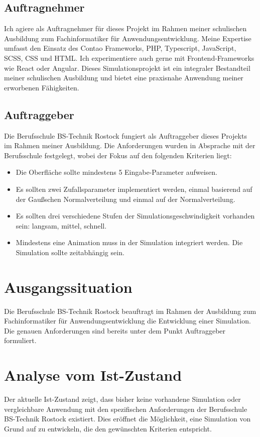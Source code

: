 \documentclass[hidelinks,12pt]{article}
\begin{document}
\subsection{Auftragnehmer}
Ich agiere als Auftragnehmer für dieses Projekt im Rahmen meiner schulischen Ausbildung zum Fachinformatiker für Anwendungsentwicklung. Meine Expertise umfasst den Einsatz des Contao Frameworks, PHP, Typescript, JavaScript, SCSS, CSS und HTML. Ich experimentiere auch gerne mit Frontend-Frameworks wie React oder Angular. Dieses Simulationsprojekt ist ein integraler Bestandteil meiner schulischen Ausbildung und bietet eine praxisnahe Anwendung meiner erworbenen Fähigkeiten.

\subsection{Auftraggeber}
Die Berufsschule BS-Technik Rostock fungiert als Auftraggeber dieses Projekts im Rahmen meiner Ausbildung. Die Anforderungen wurden in Absprache mit der Berufsschule festgelegt, wobei der Fokus auf den folgenden Kriterien liegt:

\begin{itemize}
    \item Die Oberfläche sollte mindestens 5 Eingabe-Parameter aufweisen.
    \item Es sollten zwei Zufallsparameter implementiert werden, einmal basierend auf der Gaußschen Normalverteilung und einmal auf der Normalverteilung.
    \item Es sollten drei verschiedene Stufen der Simulationsgeschwindigkeit vorhanden sein: langsam, mittel, schnell.
    \item Mindestens eine Animation muss in der Simulation integriert werden. Die Simulation sollte zeitabhängig sein.
\end{itemize}

\section{Ausgangssituation}
Die Berufsschule BS-Technik Rostock beauftragt im Rahmen der Ausbildung zum Fachinformatiker für Anwendungsentwicklung die Entwicklung einer Simulation. Die genauen Anforderungen sind bereits unter dem Punkt Auftraggeber formuliert.

\section{Analyse vom Ist-Zustand}
Der aktuelle Ist-Zustand zeigt, dass bisher keine vorhandene Simulation oder vergleichbare Anwendung mit den spezifischen Anforderungen der Berufsschule BS-Technik Rostock existiert. Dies eröffnet die Möglichkeit, eine Simulation von Grund auf zu entwickeln, die den gewünschten Kriterien entspricht.
\end{document}
